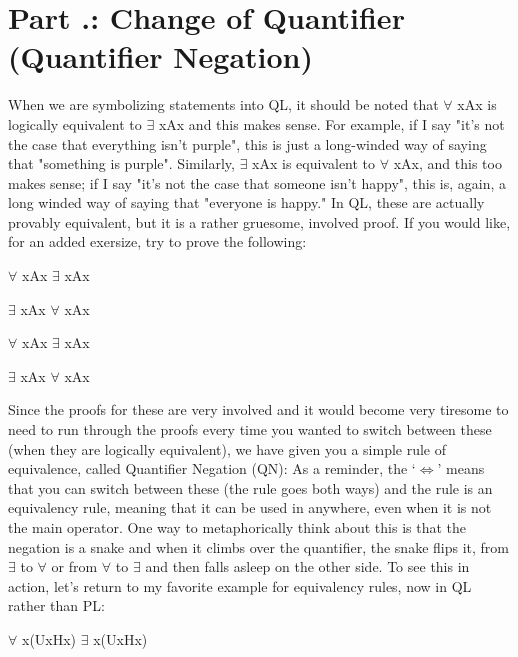 \section{Part \thechapcount.\theseccount: Change of Quantifier (Quantifier Negation)}\label{s.QN}
When we are symbolizing statements into QL, it should be noted that \enot $\forall$ x\enot Ax is logically equivalent to $\exists$ xAx and this makes sense. For example, if I say "it's not the case that everything isn't purple", this is just a long-winded way of saying that "something is purple". Similarly, \enot $\exists$ x\enot Ax is equivalent to $\forall$ xAx, and this too makes sense; if I say "it's not the case that someone isn't happy", this is, again, a long winded way of saying that "everyone is happy." In QL, these are actually provably equivalent, but it is a rather gruesome, involved proof. If you would like, for an added exersize, try to prove the following:
\begin{earg}
\item[]\enot $\forall$ x\enot Ax \therefore  $\exists$ xAx
\item[]\enot $\exists$ x\enot Ax \therefore  $\forall$ xAx
\item[]$\forall$ x\enot Ax \therefore  \enot $\exists$ xAx
\item[]$\exists$ x\enot Ax \therefore  \enot $\forall$ xAx
\end{earg}
Since the proofs for these are very involved and it would become very tiresome to need to run through the proofs every time you wanted to switch between these (when they are logically equivalent), we have given you a simple rule of equivalence, called Quantifier Negation (QN):
As a reminder, the `$\Leftrightarrow$' means that you can switch between these (the rule goes both ways) and the rule is an equivalency rule, meaning that it can be used in anywhere, even when it is not the main operator. One way to metaphorically think about this is that the negation is a snake and when it climbs over the quantifier, the snake flips it, from $\exists$  to $\forall$  or from $\forall$  to $\exists$  and then falls asleep on the other side. To see this in action, let's return to my favorite example for equivalency rules, now in QL rather than PL:
\begin{center}
\enot $\forall$ x(Ux\eif \enot Hx) \therefore  $\exists$ x(Ux\eand Hx)
\end{center}
